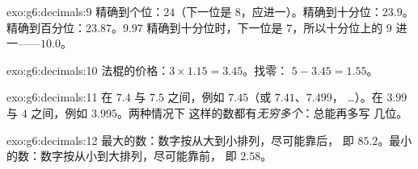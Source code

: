\begin{solution}{exo:g6:decimals:9}
精确到个位：$24$（下一位是 $8$，应进一）。精确到十分位：$23.9$。
精确到百分位：$23.87$。$9.97$ 精确到十分位时，下一位是
$7$，所以十分位上的 $9$ 进一——$10.0$。
\end{solution}

\begin{solution}{exo:g6:decimals:10}
法棍的价格：$3 \times 1.15 = 3.45$。找零：
$5 - 3.45 = 1.55$。
\end{solution}

\begin{solution}{exo:g6:decimals:11}
在 $7.4$ 与 $7.5$ 之间，例如 $7.45$（或 $7.41$、$7.499$，
\dots）。在 $3.99$ 与 $4$ 之间，例如 $3.995$。两种情况下
这样的数都有\emph{无穷多个}：总能再多写
几位。
\end{solution}

\begin{solution}{exo:g6:decimals:12}
最大的数：数字按从大到小排列，尽可能靠后，
即 $85.2$。最小的数：数字按从小到大排列，尽可能靠前，
即 $2.58$。
\end{solution}

